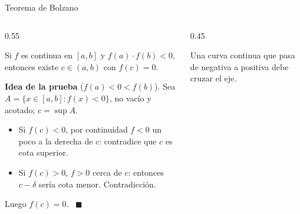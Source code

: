 \documentclass[10pt,aspectratio=169]{beamer}
\begin{document}
\begin{frame}{Teorema de Bolzano}
  \begin{columns}
    \begin{column}{0.55\textwidth}
      \begin{teorema}[Bolzano]
        Si $f$ es continua en $[a,b]$ y $f(a)\cdot f(b)<0$, entonces existe $c\in(a,b)$ con $f(c)=0$.
      \end{teorema}
      \textbf{Idea de la prueba} ($f(a)<0<f(b)$). Sea $A=\{x\in[a,b]:f(x)<0\}$, no vacío y acotado; $c=\sup A$.
      \begin{itemize}
        \item Si $f(c)<0$, por continuidad $f<0$ un poco a la derecha de $c$: contradice que $c$ es cota superior.
        \item Si $f(c)>0$, $f>0$ cerca de $c$: entonces $c-\delta$ sería cota menor. Contradicción.
      \end{itemize}
      Luego $f(c)=0$. \ $\blacksquare$
    \end{column}
    \begin{column}{0.45\textwidth}
      \centering

      \small Una curva continua que pasa de negativa a positiva debe cruzar el eje.
    \end{column}
  \end{columns}
\end{frame}
\end{document}
